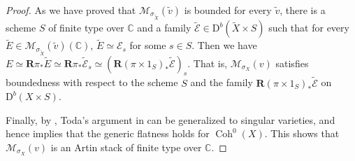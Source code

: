 \documentclass[12pt]{amsart}
\theoremstyle{definition}
\DeclareMathOperator{\Coh}{Coh}
\begin{document}
\begin{proof}
As we have proved that $\mathcal{M}_{\sigma_{\widetilde X}}(\widetilde v)$ is bounded for every $\widetilde{v}$,
there is a scheme $S$ of finite type over $\mathbb{C}$ and a family $\widetilde{\mathcal{E}} \in \mathrm{D}^b(\widetilde{X} \times S)$ such that for every $\widetilde{E} \in \mathcal{M}_{\sigma_{\widetilde X}}(\widetilde v)(\mathbb{C})$,
$\widetilde{E} \simeq \mathcal{E}_s$ for some $s \in S$.
Then we have $E \simeq \mathbf{R}\pi_\ast\widetilde{E} \simeq \mathbf{R}\pi_\ast \widetilde{\mathcal{E}}_s \simeq (\mathbf{R}(\pi \times 1_S)_\ast \widetilde{\mathcal{E}})_s$.
That is, $\mathcal{M}_{\sigma_X}(v)$ satisfies boundedness with respect to the scheme $S$ and the family $\mathbf{R}(\pi \times 1_S)_\ast \widetilde{\mathcal{E}}$ on $\mathrm{D}^b(X \times S)$.

Finally, by \cite{Pol07}, Toda's argument in \cite[Sect. 3.2]{Tod08} can be generalized to singular varieties, 
and hence \cite[Lemma 4.7]{Tod08} implies that the generic flatness holds for $\Coh^0(X)$.
This shows that $\mathcal{M}_{\sigma_X}(v)$ is an Artin stack of finite type over $\mathbb{C}$.
\end{proof}



\end{document}
